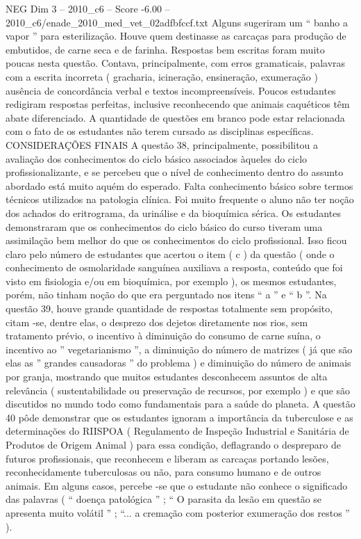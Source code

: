 \begin{textsample}{NEG Dim 3 – 2010\_c6 – Score -6.00 – 2010\_c6/enade\_2010\_med\_vet\_02adfbfccf.txt}
Alguns sugeriram um “ banho a vapor ” para esterilização.
Houve quem destinasse as carcaças para produção de embutidos, de carne seca e de farinha.
Respostas bem escritas foram muito poucas nesta questão.
Contava, principalmente, com erros gramaticais, palavras com a escrita incorreta ( gracharia, icineração, ensineração, exumeração ) ausência de concordância verbal e textos incompreensíveis.
Poucos estudantes redigiram respostas perfeitas, inclusive reconhecendo que animais caquéticos têm abate diferenciado.
A quantidade de questões em branco pode estar relacionada com o fato de os estudantes não terem cursado as disciplinas específicas.
CONSIDERAÇÕES FINAIS A questão 38, principalmente, possibilitou a avaliação dos conhecimentos do ciclo básico associados àqueles do ciclo profissionalizante, e se percebeu que o nível de conhecimento dentro do assunto abordado está muito aquém do esperado.
Falta conhecimento básico sobre termos técnicos utilizados na patologia clínica.
Foi muito frequente o aluno não ter noção dos achados do eritrograma, da urinálise e da bioquímica sérica.
Os estudantes demonstraram que os conhecimentos do ciclo básico do curso tiveram uma assimilação bem melhor do que os conhecimentos do ciclo profissional.
Isso ficou claro pelo número de estudantes que acertou o item ( c ) da questão ( onde o conhecimento de osmolaridade sanguínea auxiliava a resposta, conteúdo que foi visto em fisiologia e/ou em bioquímica, por exemplo ), os mesmos estudantes, porém, não tinham noção do que era perguntado nos itens “ a ” e “ b ”.
Na questão 39, houve grande quantidade de respostas totalmente sem propósito, citam -se, dentre elas, o desprezo dos dejetos diretamente nos rios, sem tratamento prévio, o incentivo à diminuição do consumo de carne suína, o incentivo ao ” vegetarianismo ”, a diminuição do número de matrizes ( já que são elas as ” grandes causadoras ” do problema ) e diminuição do número de animais por granja, mostrando que muitos estudantes desconhecem assuntos de alta relevância ( sustentabilidade ou preservação de recursos, por exemplo ) e que são discutidos no mundo todo como fundamentais para a saúde do planeta.
A questão 40 pôde demonstrar que os estudantes ignoram a importância da tuberculose e as determinações do RIISPOA ( Regulamento de Inspeção Industrial e Sanitária de Produtos de Origem Animal ) para essa condição, deflagrando o despreparo de futuros profissionais, que reconhecem e liberam as carcaças portando lesões, reconhecidamente tuberculosas ou não, para consumo humano e de outros animais.
Em alguns casos, percebe -se que o estudante não conhece o significado das palavras ( “ doença patológica ” ; “ O parasita da lesão em questão se apresenta muito volátil ” ; “... a cremação com posterior exumeração dos restos ” ).

\end{textsample}
